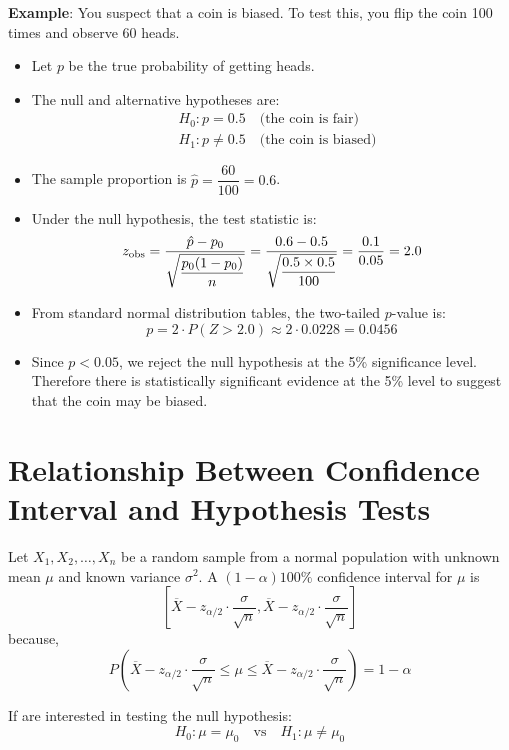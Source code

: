 \documentclass[twoside]{book}
\begin{document}
\textbf{Example}: You suspect that a coin is biased. To test this, you flip the coin 100 times and observe 60 heads.

\begin{itemize}
	\item Let \(p\) be the true probability of getting heads.
	\item The null and alternative hypotheses are:
	\begin{align*}
	&H_0: p = 0.5 \quad \text{(the coin is fair)} \\
	&H_1: p \neq 0.5 \quad \text{(the coin is biased)}
	\end{align*}
	\item The sample proportion is \(\hat{p} = \dfrac{60}{100} = 0.6\).

	\item Under the null hypothesis, the test statistic is:
	\[
	z_{\rm obs} = \frac{\hat{p} - p_0}{\sqrt{\dfrac{p_0(1 - p_0)}{n}}}
	= \frac{0.6 - 0.5}{\sqrt{\dfrac{0.5 \times 0.5}{100}}}
	= \frac{0.1}{0.05} = 2.0
	\]

	\item From standard normal distribution tables, the two-tailed \(p\)-value is:
	\[
	p = 2 \cdot P(Z > 2.0) \approx 2 \cdot 0.0228 = 0.0456
	\]

	\item Since \(p < 0.05\), we reject the null hypothesis at the 5\% significance level. Therefore there is statistically significant evidence at the 5\% level to suggest that the coin may be biased.
\end{itemize}


\section{Relationship Between Confidence Interval and Hypothesis Tests}

Let $X_1, X_2, \dots, X_n$ be a random sample from a normal population with unknown mean $\mu$ and known variance $\sigma^2$. A $(1-\alpha)100\%$ confidence interval for $\mu$ is
$$\left[\overline{X} - z_{\alpha/2} \cdot \dfrac{\sigma}{\sqrt{n}}, \overline{X} - z_{\alpha/2} \cdot \dfrac{\sigma}{\sqrt{n}}\right]$$
because,$$P\left(\overline{X} - z_{\alpha/2} \cdot \dfrac{\sigma}{\sqrt{n}} \leq  \mu \leq \overline{X} - z_{\alpha/2} \cdot \dfrac{\sigma}{\sqrt{n}}\right) = 1-\alpha$$

If are interested in testing the null hypothesis:
\[
H_0: \mu = \mu_0 \quad \text{vs} \quad H_1: \mu \ne \mu_0
\]
\end{document}
